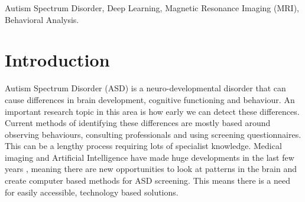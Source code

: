 \documentclass[conference]{IEEEtran}
\begin{document}
\maketitle

\begin{abstract}
Autism Spectrum Disorder (ASD) is a neurodevelopmental condition that can affect communication, learning, and social. Early identification can help children access appropriate support. This paper presents NeuroBehavior-ASD, a web-based platform that combines brain MRI classification, behavioral screening, and healthcare resource discovery. The MRI component explores deep learning techniques using the ABIDE dataset, along with image enhancement and brain symmetry features. This work achieved 95.21\% accuracy and a ROC-AUC of 0.9814 on the test partition. The platform also includes a separate Indian Autism Screening Questionnaire (IASQ) module, report generation, and location-based healthcare recommendations. The system aims to support research and improve access to relevant services.
\end{abstract}

\begin{IEEEkeywords}
Autism Spectrum Disorder, Deep Learning, Magnetic Resonance Imaging (MRI), Behavioral Analysis.
\end{IEEEkeywords}

\section{Introduction}
Autism Spectrum Disorder (ASD) is a neuro-developmental disorder that can cause differences in brain development, cognitive functioning and behaviour. An important research topic in this area is how early we can detect these differences. Current methods of identifying these differences are mostly based around observing behaviours, consulting professionals and using screening questionnaires. This can be a lengthy process requiring lots of specialist knowledge. Medical imaging and Artificial Intelligence have made huge developments in the last few years \cite{namitha2026}, meaning there are new opportunities to look at patterns in the brain and create computer based methods for ASD screening. This means there is a need for easily accessible, technology based solutions.
\end{document}
